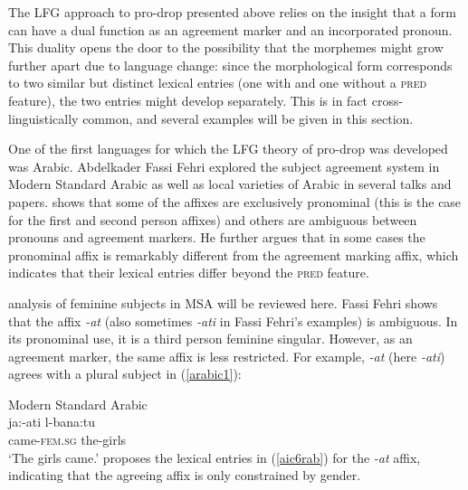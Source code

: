 \documentclass[output=paper,hidelinks]{langscibook}
\begin{document}
  The LFG approach  to pro-drop  presented above relies on the insight that  a form can have  a dual function  as an agreement  marker and an incorporated pronoun.   This duality opens the door to  the  possibility that the morphemes  might  grow  further apart  due to  language change: since the morphological form corresponds  to   two  similar but distinct lexical  entries (one with and one without a \textsc{pred} feature), the two entries might develop  separately.  This     is  in  fact  cross-linguistically common, and several  examples  will be given in this section. 
  
 One of the first languages for which the LFG theory of pro-drop was developed was  Arabic. Abdelkader  Fassi Fehri explored the subject agreement system in Modern Standard Arabic  as well as local varieties of Arabic in several talks and papers. \citet{FF}  shows   that some of the affixes are exclusively pronominal  (this is the case for the  first and second person affixes) and others are ambiguous between pronouns and agreement markers.  He further argues that  in some cases the pronominal  affix is remarkably different from   the agreement marking affix, which indicates that their lexical entries differ beyond the \textsc{pred} feature. 
 
  analysis of feminine subjects in MSA will be reviewed here.  Fassi Fehri   shows that the affix \textit{-at} (also sometimes \textit{-ati} in Fassi Fehri's examples)  is ambiguous.   In its pronominal use,  it is a third person feminine singular.  However, as an agreement marker, the same affix is less restricted.  For example,  \textit{-at} (here \textit{-ati}) agrees with a plural subject in (\ref{arabic1}):
 
 \ea \label{arabic1} Modern Standard Arabic\\
 \gll ja:\textglotstop-ati l-bana:tu \\
   came-\textsc{fem.sg} the-girls   \\
 \glt `The girls came.' 
 \z
\noindent  \citet{FF} proposes the   lexical entries  in (\ref{aic6rab}) for the  \textit{-at}  affix, indicating that the agreeing affix is only constrained by gender.
  
\end{document}
